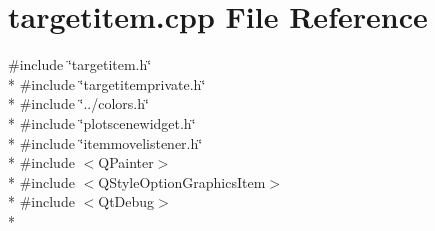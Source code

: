 \section{targetitem.\+cpp File Reference}
\label{items_2targetitem_8cpp}
{\ttfamily \#include \char`\"{}targetitem.\+h\char`\"{}}\\*
{\ttfamily \#include \char`\"{}targetitemprivate.\+h\char`\"{}}\\*
{\ttfamily \#include \char`\"{}../colors.\+h\char`\"{}}\\*
{\ttfamily \#include \char`\"{}plotscenewidget.\+h\char`\"{}}\\*
{\ttfamily \#include \char`\"{}itemmovelistener.\+h\char`\"{}}\\*
{\ttfamily \#include $<$Q\+Painter$>$}\\*
{\ttfamily \#include $<$Q\+Style\+Option\+Graphics\+Item$>$}\\*
{\ttfamily \#include $<$Qt\+Debug$>$}\\*
